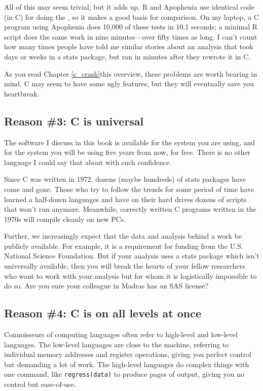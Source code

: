 {All of this may seem trivial, but it adds up. R and Apophenia use
identical code (in C) for doing the , so it makes
a good basis for comparison. On
my laptop, a C program using Apophenia does 10,000 of these tests in
10.1 seconds; a minimal R script does the same work in nine
minutes---over fifty times as long. I can't count how many times people
have told me similar stories about an analysis that took days or weeks
in a stats package, but ran in minutes after they rewrote it in C.

As you read \ifbook Chapter \ref{c_crash}\else this overview\fi, these
problems are worth bearing in mind. C may seem to have some ugly
features, but they will eventually save you heartbreak.

\subsection{Reason \#3: C is universal} 
The software I discuss in this book is available for the system you
are using, and for the system you will be using five years from now,
for free. There is no other language I could say that about with such
confidence.

Since C was written in 1972, dozens (maybe hundreds) of stats packages
have come and gone. Those who try to follow the trends for some period of
time have learned a half-dozen languages and have on their hard drives
dozens of scripts that won't run anymore.  Meanwhile, correctly written
C programs written in the 1970s will compile cleanly on new PCs.

Further, we increasingly
expect that the data and analysis behind a work be publicly available.
For example, it is a requirement for funding from the U.S. National
Science Foundation. But if your analysis uses a stats package which
isn't universally available, then you will break the hearts of 
your fellow researchers who want to work with your analysis but for whom
it is logistically impossible to do so. Are you sure your colleague in
Madras has an SAS license?


\ifbook
\subsection{Reason \#4: C is on all levels at once} 
Connoisseurs of computing languages often refer to high-level and
low-level languages. The low-level languages are close to the machine,
referring to individual memory addresses and register operations,
giving you perfect control but demanding a lot of work. The high-level
languages do complex things with one command, like {\tt regress(data)}
to produce pages of output, giving you no control but ease-of-use.

}
